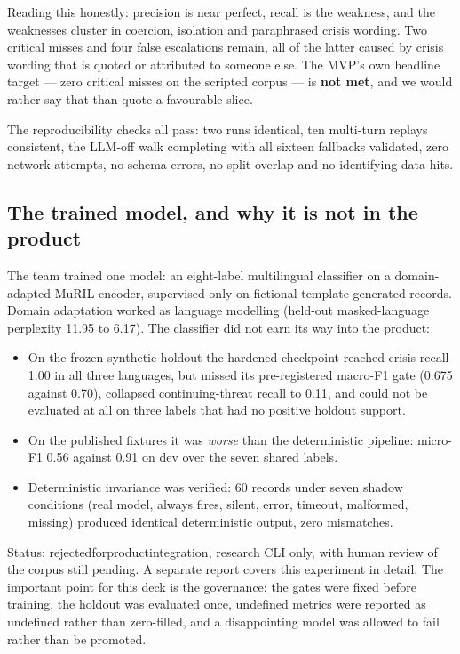 \documentclass[11pt,a4paper]{article}
\newcommand{\codeus}{\textunderscore\allowbreak}
\DeclareRobustCommand{\code}[1]{{\ttfamily\let\_\codeus #1}}
\begin{document}
\noindent Reading this honestly: precision is near perfect, recall is the weakness, and the
weaknesses cluster in coercion, isolation and paraphrased crisis wording. Two critical misses and
four false escalations remain, all of the latter caused by crisis wording that is quoted or
attributed to someone else. The MVP's own headline target --- zero critical misses on the scripted
corpus --- is \textbf{not met}, and we would rather say that than quote a favourable slice.

\noindent The reproducibility checks all pass: two runs identical, ten multi-turn replays consistent,
the LLM-off walk completing with all sixteen fallbacks validated, zero network attempts, no schema
errors, no split overlap and no identifying-data hits.

\subsection{The trained model, and why it is not in the product}
\label{sec:shadow}
The team trained one model: an eight-label multilingual classifier on a domain-adapted MuRIL encoder,
supervised only on fictional template-generated records. Domain adaptation worked as language
modelling (held-out masked-language perplexity 11.95 to 6.17). The classifier did not earn its way
into the product:

\begin{itemize}
  \item On the frozen synthetic holdout the hardened checkpoint reached crisis recall 1.00 in all
        three languages, but missed its pre-registered macro-F1 gate (0.675 against 0.70), collapsed
        continuing-threat recall to 0.11, and could not be evaluated at all on three labels that had
        no positive holdout support.
  \item On the published fixtures it was \emph{worse} than the deterministic pipeline: micro-F1 0.56
        against 0.91 on dev over the seven shared labels.
  \item Deterministic invariance was verified: 60 records under seven shadow conditions (real model,
        always fires, silent, error, timeout, malformed, missing) produced identical deterministic
        output, zero mismatches.
\end{itemize}

\noindent Status: \code{rejected\_for\_product\_integration}, research CLI only, with human review of
the corpus still pending. A separate report covers this experiment in detail. The important point for
this deck is the governance: the gates were fixed before training, the holdout was evaluated once,
undefined metrics were reported as undefined rather than zero-filled, and a disappointing model was
allowed to fail rather than be promoted.
\end{document}
